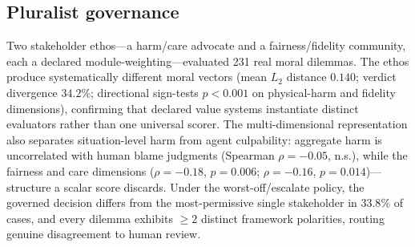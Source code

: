 \subsection{Pluralist governance}
Two stakeholder ethos---a harm/care advocate and a fairness/fidelity community, each a
declared module-weighting---evaluated 231 real moral dilemmas. The ethos produce
systematically different moral vectors (mean $L_2$ distance $0.140$; verdict divergence
$34.2\%$; directional sign-tests $p<0.001$ on physical-harm and fidelity dimensions),
confirming that declared value systems instantiate distinct evaluators rather than one
universal scorer. The multi-dimensional representation also separates situation-level harm
from agent culpability: aggregate harm is uncorrelated with human blame judgments
(Spearman $\rho=-0.05$, n.s.), while the fairness and care dimensions 
($\rho=-0.18$, $p=0.006$; $\rho=-0.16$, $p=0.014$)---structure a scalar score discards.
Under
the worst-off/escalate policy, the governed decision differs from the most-permissive single
stakeholder in $33.8\%$ of cases, and every dilemma exhibits $\geq 2$ distinct framework
polarities, routing genuine disagreement to human review.

